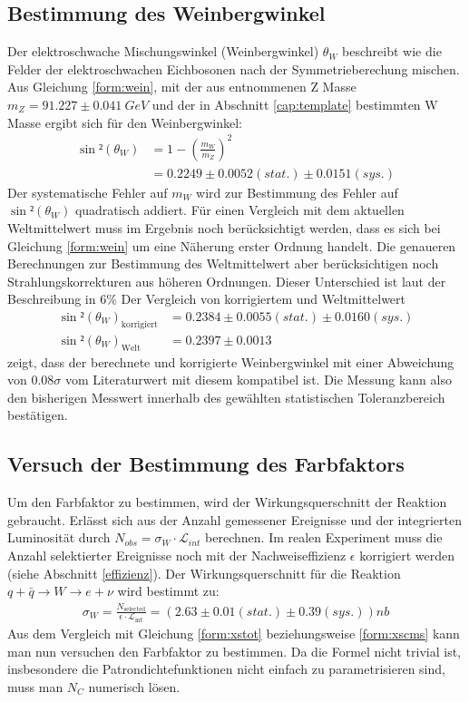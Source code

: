 \documentclass[a4paper,12pt]{article}
\begin{document}
\subsection{Bestimmung des Weinbergwinkel}
Der elektroschwache Mischungswinkel (Weinbergwinkel) $\theta_{W}$ beschreibt wie die Felder der elektroschwachen Eichbosonen nach der Symmetrieberechung mischen.
Aus Gleichung \ref{form:wein}, mit der aus \cite{versuchsanleitung} entnommenen Z Masse
$m_{Z}=91.227 \pm \SI{0.041}{GeV}$ und der in Abschnitt \ref{cap:template} bestimmten W Masse ergibt
sich für den Weinbergwinkel:
\begin{align*}
	\sin²\left(\theta_{W}\right) &= 1 - \left(\frac{m_{W}}{m_{Z}}\right)^{2} \\
	&=  0.2249 ± 0.0052 (stat.) ± 0.0151(sys.)
\end{align*}
Der systematische Fehler auf $m_{W}$ wird zur Bestimmung des Fehler auf $\sin²(\theta_{W})$ quadratisch addiert.
Für einen Vergleich mit dem aktuellen Weltmittelwert muss im Ergebnis noch berücksichtigt werden,
dass es sich bei Gleichung \ref{form:wein} um eine
Näherung erster Ordnung handelt. Die genaueren Berechnungen zur Bestimmung des Weltmittelwert aber berücksichtigen noch Strahlungskorrekturen aus höheren
Ordnungen. Dieser Unterschied ist laut der Beschreibung in \cite{versuchsanleitung} $6\%$
Der Vergleich von korrigiertem und Weltmittelwert
\begin{align*}
	\sin²(\theta_{W})_\text{korrigiert} &=  0.2384 ± 0.0055 (stat.) ± 0.0160(sys.) \\
	\sin²(\theta_{W})_\text{Welt} &= 0.2397 \pm 0.0013
\end{align*}
zeigt, dass der berechnete und korrigierte Weinbergwinkel mit einer Abweichung von $0.08\sigma$ vom Literaturwert mit diesem
 kompatibel ist. Die Messung kann also den bisherigen Messwert innerhalb des gewählten statistischen
Toleranzbereich bestätigen.


\subsection{Versuch der Bestimmung des Farbfaktors}
Um den Farbfaktor zu bestimmen, wird der Wirkungsquerschnitt der Reaktion gebraucht.
Erlässt sich aus der Anzahl gemessener Ereignisse und der
integrierten Luminosität durch $N_{obs}=\sigma_W \cdot \mathcal{L}_{int}$ berechnen. Im realen Experiment
muss die Anzahl selektierter Ereignisse noch mit der Nachweiseffizienz $\epsilon$
korrigiert werden (siehe Abschnitt \ref{effizienz}).
Der Wirkungsquerschnitt für die Reaktion $q+\bar{q}\rightarrow W \rightarrow e+ \nu$ wird bestimmt zu:
\begin{align*}
	\sigma_W = \frac{N_\text{selected}}{\epsilon \cdot \mathcal{L}_\text{int}} = ( 2.63 ± 0.01 (stat.) ± 0.39(sys.)) \si{nb}
\end{align*}
Aus dem Vergleich mit Gleichung \ref{form:xstot} beziehungsweise \ref{form:xscms} kann man nun
versuchen den Farbfaktor zu bestimmen. Da die Formel nicht trivial ist, insbesondere die
Patrondichtefunktionen nicht einfach zu parametrisieren sind, muss man $N_C$ numerisch lösen.
\end{document}
